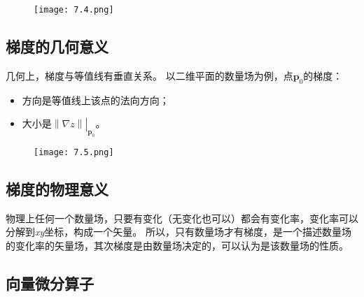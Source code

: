 \begin{figure}[h]
\centering
\texttt{[image: 7.4.png]}
\end{figure}

\subsection{梯度的几何意义}

几何上，梯度与等值线有垂直关系。
以二维平面的数量场为例，点$\boldsymbol{p}_0$的梯度：
\begin{itemize}
    \item 方向是等值线上该点的法向方向；
    \item 大小是$\left. \left\| \nabla z \right\| \right|_{\boldsymbol{p}_0}$。
\end{itemize}

\begin{figure}[h]
\centering
\texttt{[image: 7.5.png]}
\end{figure}

\subsection{梯度的物理意义}

物理上任何一个数量场，只要有变化（无变化也可以）都会有变化率，变化率可以分解到{\it xy}坐标，构成一个矢量。
所以，只有数量场才有梯度，是一个描述数量场的变化率的矢量场，其次梯度是由数量场决定的，可以认为是该数量场的性质。

\subsection{向量微分算子}

